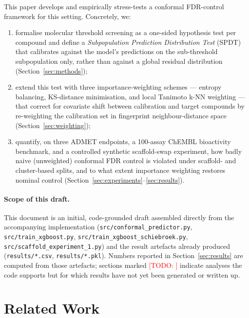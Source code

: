 \documentclass[11pt]{article}
\newcommand{\TODO}[1]{\textcolor{red}{[TODO: #1]}}
\begin{document}
This paper develops and empirically stress-tests a conformal FDR-control
framework for this setting. Concretely, we:
\begin{enumerate}
    \item formalise molecular threshold screening as a one-sided hypothesis test
    per compound and define a \emph{Subpopulation Prediction Distribution Test}
    (SPDT) that calibrates against the model's predictions on the
    sub-threshold subpopulation only, rather than against a global residual
    distribution (Section~\ref{sec:methods});
    \item extend this test with three importance-weighting schemes --- entropy
    balancing, KS-distance minimisation, and local Tanimoto k-NN weighting ---
    that correct for covariate shift between calibration and target compounds
    by re-weighting the calibration set in fingerprint neighbour-distance space
    (Section~\ref{sec:weighting});
    \item quantify, on three ADMET endpoints, a 100-assay ChEMBL bioactivity
    benchmark, and a controlled synthetic scaffold-swap experiment, how badly
    naive (unweighted) conformal FDR control is violated under scaffold- and
    cluster-based splits, and to what extent importance weighting restores
    nominal control (Section~\ref{sec:experiments}--\ref{sec:results}).
\end{enumerate}

\paragraph{Scope of this draft.} This document is an initial, code-grounded
draft assembled directly from the accompanying implementation
(\texttt{src/conformal\_predictor.py}, \texttt{src/train\_xgboost.py},
\texttt{src/train\_xgboost\_schiebroek.py}, \texttt{src/scaffold\_experiment\_1.py})
and the result artefacts already produced (\texttt{results/*.csv},
\texttt{results/*.pkl}). Numbers reported in Section~\ref{sec:results} are
computed from those artefacts; sections marked \TODO{} indicate analyses the
code supports but for which results have not yet been generated or written up.

\section{Related Work}
\end{document}
